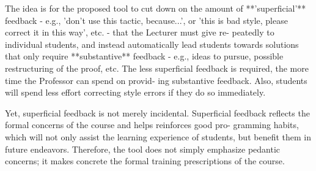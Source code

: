 The idea is for the proposed tool to cut down on the amount of **’superficial’** feedback - e.g., ’don’t use this tactic, because...’, or ’this is bad style, please correct it in this way’, etc. - that the Lecturer must give re- peatedly to individual students, and instead automatically lead students towards solutions that only require **substantive** feedback - e.g., ideas to pursue, possible restructuring of the proof, etc. The less superficial feedback is required, the more time the Professor can spend on provid- ing substantive feedback. Also, students will spend less effort correcting style errors if they do so immediately.

Yet, superficial feedback is not merely incidental. Superficial feedback reflects the formal concerns of the course and helps reinforces good pro- gramming habits, which will not only assist the learning experience of students, but benefit them in future endeavors. Therefore, the tool does not simply emphasize pedantic concerns; it makes concrete the formal training prescriptions of the course.